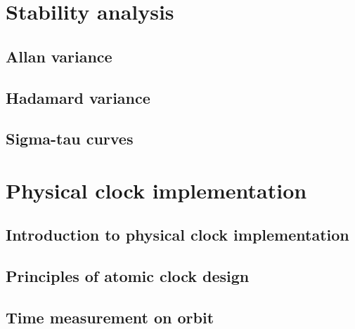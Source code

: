 \section{Stability analysis}

\subsection{Allan variance}

\subsection{Hadamard variance}

\subsection{Sigma-tau curves}



\section{Physical clock implementation}

\subsection{Introduction to physical clock implementation}

\subsection{Principles of atomic clock design}

\subsection{Time measurement on orbit}


